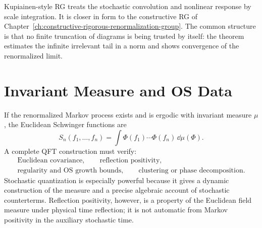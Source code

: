 Kupiainen-style RG treats the stochastic convolution and nonlinear response
by scale integration.  It is closer in form to the constructive RG of
Chapter~\ref{ch:constructive-rigorous-renormalization-group}.  The common
structure is that no finite truncation of diagrams is being trusted by
itself: the theorem estimates the infinite irrelevant tail in a norm and
shows convergence of the renormalized limit.

\section{Invariant Measure and OS Data}

If the renormalized Markov process exists and is ergodic with invariant
measure \(\mu\), the Euclidean Schwinger functions are
\begin{equation}
  S_n(f_1,\ldots,f_n)
  =
  \int \Phi(f_1)\cdots\Phi(f_n)\,\dd\mu(\Phi).
  \label{eq:spde-invariant-measure-schwinger}
\end{equation}
A complete QFT construction must verify:
\[
\begin{gathered}
  \text{Euclidean covariance},\qquad
  \text{reflection positivity},\\
  \text{regularity and OS growth bounds},\qquad
  \text{clustering or phase decomposition}.
\end{gathered}
\]
Stochastic quantization is especially powerful because it gives a dynamic
construction of the measure and a precise algebraic account of stochastic
counterterms.  Reflection positivity, however, is a property of the
Euclidean field measure under physical time reflection; it is not automatic
from Markov positivity in the auxiliary stochastic time.

